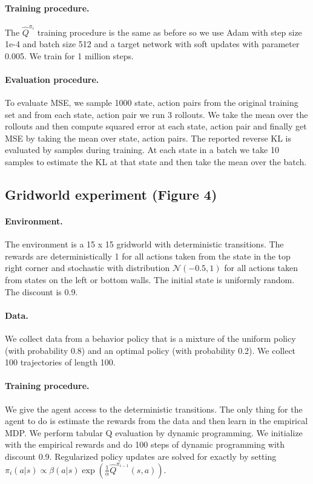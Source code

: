 \paragraph{Training procedure.} The $\widehat Q^{\pi_i}$ training procedure is the same as before so we use Adam with step size 1e-4 and batch size 512 and a target network with soft updates with parameter 0.005. We train for 1 million steps.

\paragraph{Evaluation procedure.} To evaluate MSE, we sample 1000 state, action pairs from the original training set and from each state, action pair we run 3 rollouts. We take the mean over the rollouts and then compute squared error at each state, action pair and finally get MSE by taking the mean over state, action pairs. The reported reverse KL is evaluated by samples during training. At each state in a batch we take 10 samples to estimate the KL at that state and then take the mean over the batch.


\subsection{Gridworld experiment (Figure 4)}

\paragraph{Environment.} The environment is a 15 x 15 gridworld with deterministic transitions. The rewards are deterministically 1 for all actions taken from the state in the top right corner and stochastic with distribution $ \mathcal{N}(-0.5, 1)$ for all actions taken from states on the left or bottom walls. The initial state is uniformly random. The discount is 0.9.

\paragraph{Data.} We collect data from a behavior policy that is a mixture of the uniform policy (with probability 0.8) and an optimal policy (with probability 0.2). We collect 100 trajectories of length 100.

\paragraph{Training procedure.} We give the agent access to the deterministic transitions. The only thing for the agent to do is estimate the rewards from the data and then learn in the empirical MDP. We perform tabular Q evaluation by dynamic programming. We initialize with the empirical rewards and do 100 steps of dynamic programming with discount 0.9. Regularized policy updates are solved for exactly by setting $ \pi_i(a|s) \propto \beta(a|s) \exp(\frac{1}{\alpha} \widehat Q^{\pi_{i-1}}(s,a))$.





